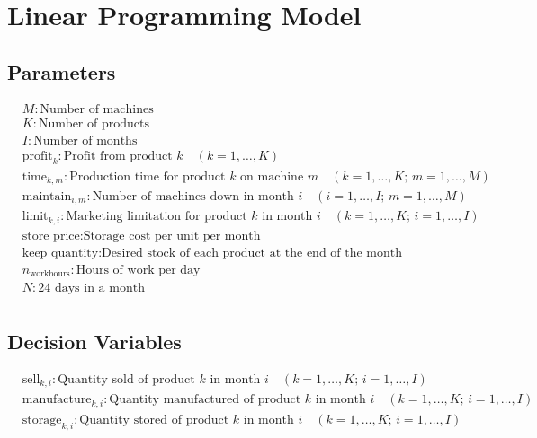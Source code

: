 \documentclass{article}
\begin{document}
\section*{Linear Programming Model}

\subsection*{Parameters}
\begin{align*}
& M: \text{Number of machines} \\
& K: \text{Number of products} \\
& I: \text{Number of months} \\
& \text{profit}_{k}: \text{Profit from product } k \quad (k = 1, \ldots, K) \\
& \text{time}_{k, m}: \text{Production time for product } k \text{ on machine } m \quad (k = 1, \ldots, K; \, m = 1, \ldots, M) \\
& \text{maintain}_{i, m}: \text{Number of machines down in month } i \quad (i = 1, \ldots, I; \, m = 1, \ldots, M) \\
& \text{limit}_{k, i}: \text{Marketing limitation for product } k \text{ in month } i \quad (k = 1, \ldots, K; \, i = 1, \ldots, I) \\
& \text{store\_price}: \text{Storage cost per unit per month} \\
& \text{keep\_quantity}: \text{Desired stock of each product at the end of the month} \\
& n_{\text{workhours}}: \text{Hours of work per day} \\
& N: 24 \text{ days in a month} \\
\end{align*}

\subsection*{Decision Variables}
\begin{align*}
& \text{sell}_{k, i}: \text{Quantity sold of product } k \text{ in month } i \quad (k = 1, \ldots, K; \, i = 1, \ldots, I) \\
& \text{manufacture}_{k, i}: \text{Quantity manufactured of product } k \text{ in month } i \quad (k = 1, \ldots, K; \, i = 1, \ldots, I) \\
& \text{storage}_{k, i}: \text{Quantity stored of product } k \text{ in month } i \quad (k = 1, \ldots, K; \, i = 1, \ldots, I) \\
\end{align*}
\end{document}
